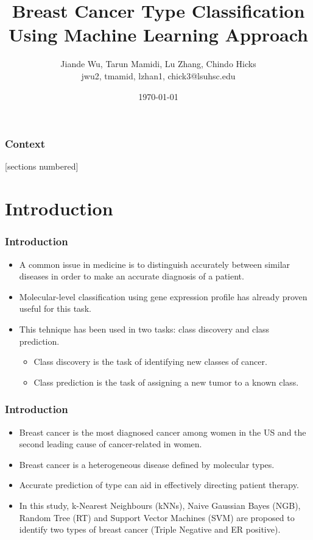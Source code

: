 \documentclass[xcolor=table]{beamer}
\title[Breast cancer --- Machine learning]{Breast Cancer Type Classification Using Machine Learning Approach}
\author[J. Wu, T. Mamidi, L. Zhang, C. Hicks]{\scriptsize{Jiande Wu, Tarun Mamidi, Lu Zhang, Chindo Hicks}\\{\ttfamily jwu2, tmamid, lzhan1, chick3@lsuhsc.edu}}
\institute{Department of Genetics, LSUHSC\\ Bioinformatics and Genomics (BIG) Program}
\date{\today}
\numberwithin{figure}{section}
\numberwithin{equation}{section}
\begin{document}

\begin{frame}[plain,t]
\titlepage
\end{frame}


\begin{frame}%
  \addtocounter{framenumber}{-1}
  \frametitle{Context}
  [sections numbered]
  \tableofcontents[hideallsubsections]
\end{frame}


\section{Introduction}
\begin{frame}
 \frametitle{Introduction}
 \begin{itemize}
     \item A common issue in medicine is to distinguish accurately between similar diseases in order to make an accurate diagnosis of a patient. 
     \item Molecular-level classification using gene expression profile has already proven useful for this task.
     \item This tehnique has been used in two tasks: class discovery and class prediction. 
     \begin{itemize}
     \item Class discovery is the task of identifying new classes of cancer.
     \item Class prediction is the task of assigning a new tumor to a known class.
     \end{itemize}
 \end{itemize}
\end{frame}

\begin{frame}
 \frametitle{Introduction}
  \begin{itemize}
    \item Breast cancer is the most diagnosed cancer among women in the US and the second leading cause of cancer-related in women.
    \item Breast cancer is a heterogeneous disease defined by molecular types. 
    \item Accurate prediction of type can aid in effectively directing patient therapy. 
    \item In this study, k-Nearest Neighbours (kNNs), Naive Gaussian Bayes (NGB), Random Tree (RT) and Support Vector Machines (SVM) are proposed to identify two types of breast cancer (Triple Negative and ER positive).
  \end{itemize}
\end{frame}
\end{document}
